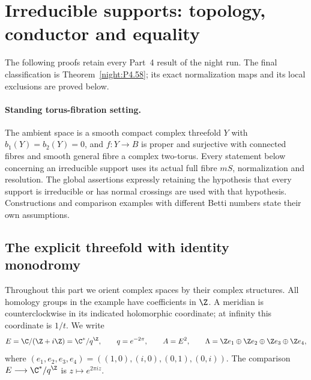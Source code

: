 \section{Irreducible supports: topology, conductor and equality}
\label{sec:II:night-sign}
The following proofs retain every Part~4 result of the night run. The final classification is Theorem~\ref{night:P4.58}; its exact normalization maps and its local exclusions are proved below.
\paragraph{Standing torus-fibration setting.} The ambient space is a smooth compact complex threefold $Y$ with $b_1(Y)=b_2(Y)=0$, and $f:Y\to B$ is proper and surjective with connected fibres and smooth general fibre a complex two-torus. Every statement below concerning an irreducible support uses its actual full fibre $mS$, normalization and resolution. The global assertions expressly retaining the hypothesis that every support is irreducible or has normal crossings are used with that hypothesis. Constructions and comparison examples with different Betti numbers state their own assumptions.
\subsection{The explicit threefold with identity monodromy}

Throughout this part we orient complex spaces by their complex structures.
All homology groups in the example have coefficients in $\Z$. A meridian is
counterclockwise in its indicated holomorphic coordinate; at infinity this
coordinate is $1/t$. We write
\[
 E=\C/(\Z+i\Z)=\C^*/q^\Z,\qquad q=e^{-2\pi},\qquad
 A=E^2,\qquad \Lambda=\Z e_1\oplus\Z e_2\oplus\Z e_3\oplus\Z e_4,
\]
where $(e_1,e_2,e_3,e_4)=((1,0),(i,0),(0,1),(0,i))$. The comparison
$E\longrightarrow\C^*/q^\Z$ is $z\mapsto e^{2\pi iz}$.

